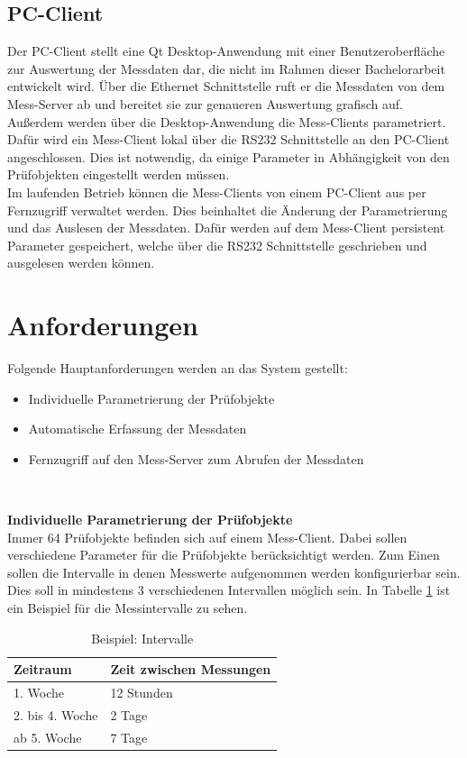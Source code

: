 \subsection{PC-Client}
\label{section_PC-Client}
Der PC-Client stellt eine Qt Desktop-Anwendung mit einer Benutzeroberfläche zur Auswertung der Messdaten dar, die nicht im Rahmen dieser Bachelorarbeit entwickelt wird. Über die Ethernet Schnittstelle ruft er die Messdaten von dem Mess-Server ab und bereitet sie zur genaueren Auswertung grafisch auf.\\
Außerdem werden über die Desktop-Anwendung die Mess-Clients parametriert. Dafür wird ein Mess-Client lokal über die RS232 Schnittstelle an den PC-Client angeschlossen. Dies ist notwendig, da einige Parameter in Abhängigkeit von den Prüfobjekten eingestellt werden müssen.\\
Im laufenden Betrieb können die Mess-Clients von einem PC-Client aus per Fernzugriff verwaltet werden. Dies beinhaltet die Änderung der Parametrierung und das Auslesen der Messdaten. Dafür werden auf dem Mess-Client persistent Parameter gespeichert, welche über die RS232 Schnittstelle geschrieben und ausgelesen werden können.



\section{Anforderungen}
Folgende Hauptanforderungen werden an das System gestellt:
\begin{itemize}
\item Individuelle Parametrierung der Prüfobjekte
\item Automatische Erfassung der Messdaten
\item Fernzugriff auf den Mess-Server zum Abrufen der Messdaten
\end{itemize}
\ 

\textbf{Individuelle Parametrierung der Prüfobjekte}\\
Immer 64 Prüfobjekte befinden sich auf einem Mess-Client. Dabei sollen verschiedene Parameter für die Prüfobjekte berücksichtigt werden. 
Zum Einen sollen die Intervalle in denen Messwerte aufgenommen werden konfigurierbar sein. Dies soll in mindestens 3 verschiedenen Intervallen möglich sein. In Tabelle \ref{table_Intervalle} ist ein Beispiel für die Messintervalle zu sehen. 

 
\begin{table}[H]
\begin{center}
\begin{tabular}{|l|l|}\hline
Zeitraum & Zeit zwischen Messungen \\ \hline
1. Woche & 12 Stunden\\ 
2. bis 4. Woche & 2 Tage\\ 
ab 5. Woche & 7 Tage\\ \hline
\end{tabular}
\caption{Beispiel: Intervalle}
\label{table_Intervalle}
\end{center}
\end{table}



